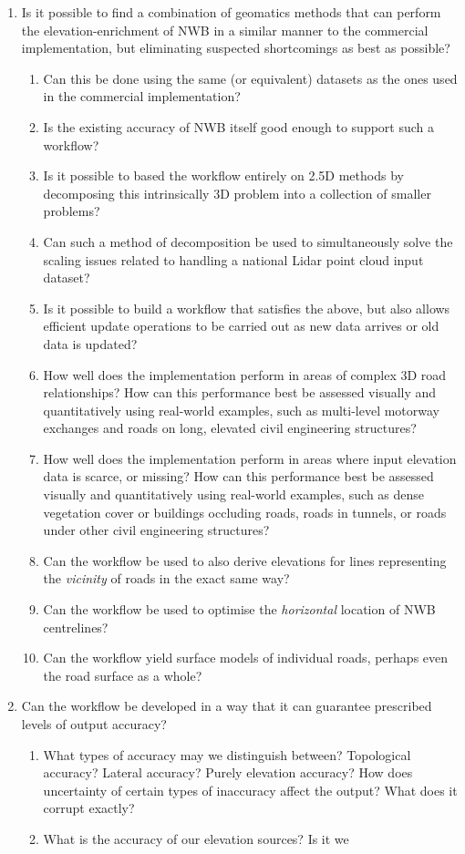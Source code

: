 \begin{enumerate}
\item Is it possible to find a combination of geomatics methods that can perform the elevation-enrichment of NWB in a similar manner to the commercial implementation, but eliminating suspected shortcomings as best as possible?
\begin{enumerate}
    \item Can this be done using the same (or equivalent) datasets as the ones used in the commercial implementation?
    \item Is the existing accuracy of NWB itself good enough to support such a workflow?
    \item Is it possible to based the workflow entirely on 2.5D methods by decomposing this intrinsically 3D problem into a collection of smaller problems?
    \item Can such a method of decomposition be used to simultaneously solve the scaling issues related to handling a national Lidar point cloud input dataset?
    \item Is it possible to build a workflow that satisfies the above, but also allows efficient update operations to be carried out as new data arrives or old data is updated?
    \item How well does the implementation perform in areas of complex 3D road relationships? How can this performance best be assessed visually and quantitatively using real-world examples, such as multi-level motorway exchanges and roads on long, elevated civil engineering structures?
    \item How well does the implementation perform in areas where input elevation data is scarce, or missing? How can this performance best be assessed visually and quantitatively using real-world examples, such as dense vegetation cover or buildings occluding roads, roads in tunnels, or roads under other civil engineering structures?
    \item Can the workflow be used to also derive elevations for lines representing the \textit{vicinity} of roads in the exact same way?
    \item Can the workflow be used to optimise the \textit{horizontal} location of NWB centrelines?
    \item Can the workflow yield surface models of individual roads, perhaps even the road surface as a whole?
\end{enumerate}
\item Can the workflow be developed in a way that it can guarantee prescribed levels of output accuracy?
\begin{enumerate}
\item What types of accuracy may we distinguish between? Topological accuracy? Lateral accuracy? Purely elevation accuracy? How does uncertainty of certain types of inaccuracy affect the output? What does it corrupt exactly?
\item What is the accuracy of our elevation sources? Is it we
\end{enumerate}
\end{enumerate}